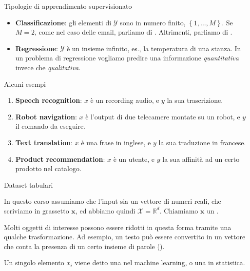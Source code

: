 \documentclass[12pt,aspectratio=169]{beamer}
\begin{document}
\begin{frame}{Tipologie di apprendimento supervisionato}

	\begin{itemize}
		\item \textbf{Classificazione}: gli elementi di $\mathcal{Y}$ sono in numero finito, $\left\{1, \ldots, M\right\}$. Se $M=2$, come nel caso delle email, parliamo di . Altrimenti, parliamo di .
		\item \textbf{Regressione}: $\mathcal{Y}$ è un insieme infinito, es., la temperatura di una stanza. In un problema di regressione vogliamo predire una informazione \textit{quantitativa} invece che \textit{qualitativa}.
	\end{itemize}
	
\end{frame}

\begin{frame}{Alcuni esempi}
	
	\begin{enumerate}
		\item \textbf{Speech recognition}: $x$ è un recording audio, e $y$ la sua trascrizione.
		\item \textbf{Robot navigation}: $x$ è l'output di due telecamere montate su un robot, e $y$ il comando da eseguire.
		\item \textbf{Text translation}: $x$ è una frase in inglese, e $y$ la sua traduzione in francese.
		\item \textbf{Product recommendation}: $x$ è un utente, e $y$ la sua affinità ad un certo prodotto nel catalogo.
	\end{enumerate}
	
\end{frame}

\begin{frame}{Dataset tabulari}
	
	In questo corso assumiamo che l'input sia un vettore di numeri reali, che scriviamo in grassetto $\mathbf{x}$, ed abbiamo quindi $\mathcal{X} = \mathbb{R}^d$. Chiamiamo $\mathbf{x}$ un .
	
	Molti oggetti di interesse possono essere ridotti in questa forma tramite una qualche trasformazione. Ad esempio, un testo può essere convertito in un vettore che conta la presenza di un certo insieme di parole ().
	
	Un singolo elemento $x_i$ viene detto una  nel machine learning, o una  in statistica.
	
\end{frame}
\end{document}
